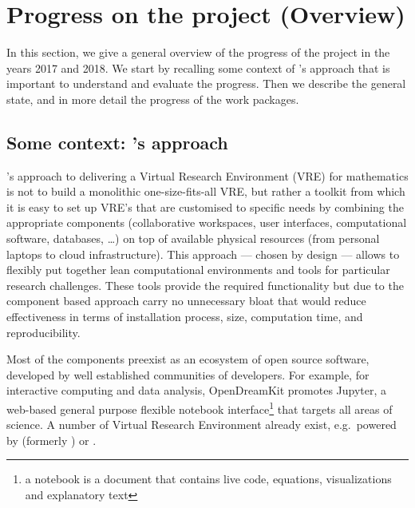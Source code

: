 \section{Progress on the project (Overview)}

In this section, we give a general overview of the progress of the project in the years
2017 and 2018. We start by recalling some context of \ODK's approach that is important to
understand and evaluate the progress. Then we describe the general state, and in more
detail the progress of the work packages.

\subsection{Some context: \ODK's approach}
\ODK's approach to delivering a Virtual Research Environment (VRE) for
mathematics is not to build a monolithic one-size-fits-all VRE, but
rather a toolkit from which it is easy to set up VRE's that are
customised to specific needs by combining the appropriate components
(collaborative workspaces, user interfaces, computational software,
databases, \dots) on top of available physical resources (from
personal laptops to cloud infrastructure). This approach --- chosen by
design --- allows to flexibly put together lean computational
environments and tools for particular research challenges. These tools
provide the required functionality but due to the component based
approach carry no unnecessary bloat that would reduce effectiveness in
terms of installation process, size, computation time, and
reproducibility.

Most of the components preexist as an ecosystem of open source
software, developed by well established communities of developers. For
example, for interactive computing and data analysis, OpenDreamKit
promotes Jupyter, a web-based general purpose flexible notebook
interface\footnote{a notebook is a document that contains live code,
  equations, visualizations and explanatory text} that targets all
areas of science. A number of Virtual Research Environment already
exist, e.g.\ powered by \cocalc (formerly \SMC) or \JupyterHub.

